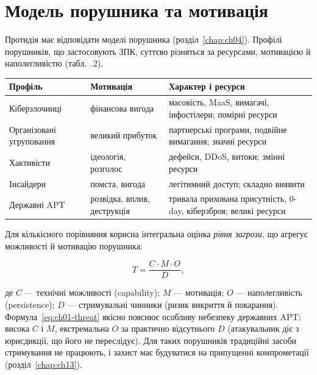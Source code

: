 \section{Модель порушника та мотивація}\label{sec:ch01-adversary}

Протидія має відповідати моделі порушника (розділ~\ref{chap:ch04}). Профілі порушників, що застосовують ЗПК, суттєво різняться за ресурсами, мотивацією й наполегливістю (табл.~\thechapter.2).


\begin{center}\footnotesize
\begin{tabularx}{\linewidth}{L{26mm} L{22mm} Y}
\toprule
Профіль & Мотивація & Характер і ресурси \\
\midrule
Кіберзлочинці & фінансова вигода & масовість, MaaS, вимагачі, інфостілери; помірні ресурси \\
Організовані угруповання & великий прибуток & партнерські програми, подвійне вимагання; значні ресурси \\
Хактивісти & ідеологія, розголос & дефейси, DDoS, витоки; змінні ресурси \\
Інсайдери & помста, вигода & легітимний доступ; складно виявити \\
Державні APT & розвідка, вплив, деструкція & тривала прихована присутність, 0-day, кіберзброя; великі ресурси \\
\bottomrule
\end{tabularx}
\end{center}

Для кількісного порівняння корисна інтегральна оцінка \emph{рівня загрози}, що агрегує можливості й мотивацію порушника:

\begin{equation}
T = \frac{C \cdot M \cdot O}{D},
\label{eq:ch01-threat}
\end{equation}

де $C$ --- технічні можливості (capability); $M$ --- мотивація; $O$ --- наполегливість (persistence); $D$ --- стримувальні чинники (ризик викриття й покарання). Формула~\eqref{eq:ch01-threat} якісно пояснює особливу небезпеку державних APT: висока $C$ і $M$, екстремальна $O$ за практично відсутнього $D$ (атакувальник діє з юрисдикції, що його не переслідує). Для таких порушників традиційні засоби стримування не працюють, і захист має будуватися на припущенні компрометації (розділ~\ref{chap:ch13}).


